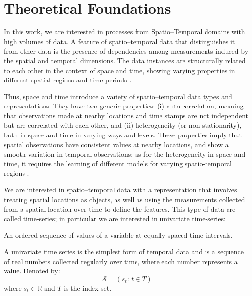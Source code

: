\chapter{Theoretical Foundations}
\label{chapter_Theoretical_Foundations}

In this work, we are interested in processes from Spatio--Temporal domains with high volumes of data. A feature of spatio--temporal data that distinguishes it from other data is the presence of dependencies among measurements induced by the spatial and temporal dimensions. The data instances are structurally related to each other in the context of space and time, showing varying properties in different spatial regions and time periods \cite{Atluri2018}. 

Thus, space and time introduce a variety of spatio--temporal data types and representations. They have two generic properties: (i) auto-correlation, meaning that observations made at nearby locations and time stamps are not independent but are correlated with each other, and (ii) heterogeneity (or non-stationarity), both in space and time in varying ways and levels. These properties imply that spatial observations have consistent values at nearby locations, and show a smooth variation in temporal observations; as for the heterogeneity in space and time, it requires the learning of different models for varying spatio-temporal regions \cite{Wikle2019}.

We are interested in spatio--temporal data with a representation that involves treating spatial locations as objects, as well as using the measurements collected from a spatial location over time to define the features. This type of data are called time-series; in particular we are interested in univariate time-series:

\begin{definition}
	An ordered sequence of values of a variable at equally spaced time intervals.
\end{definition}

\begin{definition}
	A univariate time series is the simplest form of temporal data and is a sequence of real numbers collected regularly over time, where each number represents a value. Denoted by:
	\begin{equation}
	    \mathcal{S} = \left(s_{t}: \, t \in T \right)
	\end{equation}
	where $s_{t} \in \mathbb{R}$ and $T$ is the index set.
\end{definition}

